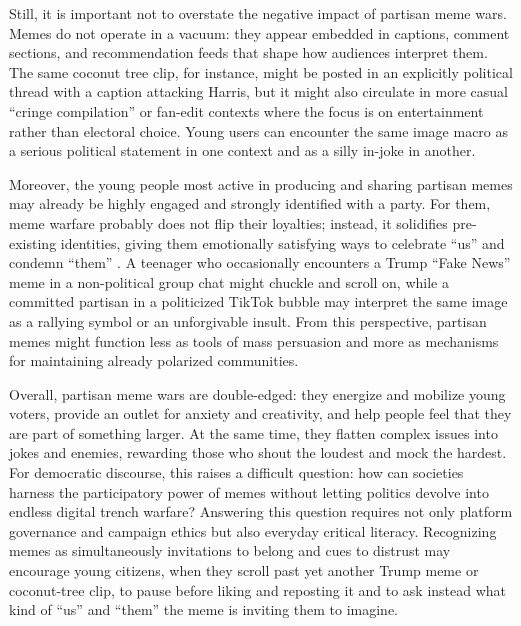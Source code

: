 \documentclass[12pt,twoside]{article}
\begin{document}

Still, it is important not to overstate the negative impact of partisan meme wars. Memes do not operate in a vacuum: they appear embedded in captions, comment sections, and recommendation feeds that shape how audiences interpret them. The same coconut tree clip, for instance, might be posted in an explicitly political thread with a caption attacking Harris, but it might also circulate in more casual ``cringe compilation'' or fan-edit contexts where the focus is on entertainment rather than electoral choice. Young users can encounter the same image macro as a serious political statement in one context and as a silly in-joke in another.

Moreover, the young people most active in producing and sharing partisan memes may already be highly engaged and strongly identified with a party. For them, meme warfare probably does not flip their loyalties; instead, it solidifies pre-existing identities, giving them emotionally satisfying ways to celebrate ``us'' and condemn ``them'' \parencite{galipeau2023impactpoliticalmemes}. A teenager who occasionally encounters a Trump ``Fake News'' meme in a non-political group chat might chuckle and scroll on, while a committed partisan in a politicized TikTok bubble may interpret the same image as a rallying symbol or an unforgivable insult. From this perspective, partisan memes might function less as tools of mass persuasion and more as mechanisms for maintaining already polarized communities.


Overall, partisan meme wars are double-edged: they energize and mobilize young voters, provide an outlet for anxiety and creativity, and help people feel that they are part of something larger. At the same time, they flatten complex issues into jokes and enemies, rewarding those who shout the loudest and mock the hardest. For democratic discourse, this raises a difficult question: how can societies harness the participatory power of memes without letting politics devolve into endless digital trench warfare? Answering this question requires not only platform governance and campaign ethics but also everyday critical literacy. Recognizing memes as simultaneously invitations to belong and cues to distrust may encourage young citizens, when they scroll past yet another Trump meme or coconut-tree clip, to pause before liking and reposting it and to ask instead what kind of ``us'' and ``them'' the meme is inviting them to imagine.
\end{document}
